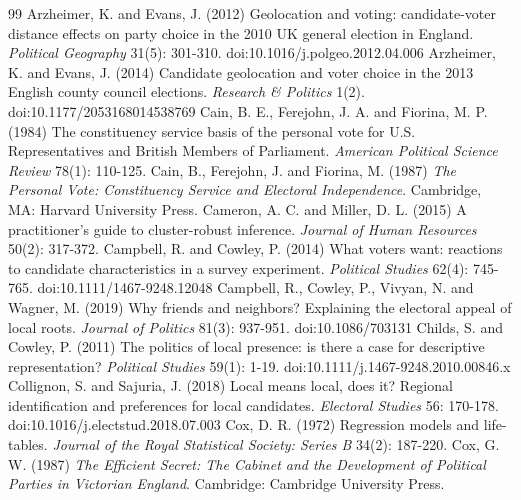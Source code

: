 \documentclass[11pt,a4paper]{article}
\begin{document}
\begin{thebibliography}{99}
 Arzheimer, K. and Evans, J. (2012) Geolocation and voting: candidate-voter distance effects on party choice in the 2010 UK general election in England. \textit{Political Geography} 31(5): 301-310. doi:10.1016/j.polgeo.2012.04.006
 Arzheimer, K. and Evans, J. (2014) Candidate geolocation and voter choice in the 2013 English county council elections. \textit{Research \& Politics} 1(2). doi:10.1177/2053168014538769
 Cain, B. E., Ferejohn, J. A. and Fiorina, M. P. (1984) The constituency service basis of the personal vote for U.S. Representatives and British Members of Parliament. \textit{American Political Science Review} 78(1): 110-125.
 Cain, B., Ferejohn, J. and Fiorina, M. (1987) \textit{The Personal Vote: Constituency Service and Electoral Independence}. Cambridge, MA: Harvard University Press.
 Cameron, A. C. and Miller, D. L. (2015) A practitioner's guide to cluster-robust inference. \textit{Journal of Human Resources} 50(2): 317-372.
 Campbell, R. and Cowley, P. (2014) What voters want: reactions to candidate characteristics in a survey experiment. \textit{Political Studies} 62(4): 745-765. doi:10.1111/1467-9248.12048
 Campbell, R., Cowley, P., Vivyan, N. and Wagner, M. (2019) Why friends and neighbors? Explaining the electoral appeal of local roots. \textit{Journal of Politics} 81(3): 937-951. doi:10.1086/703131
 Childs, S. and Cowley, P. (2011) The politics of local presence: is there a case for descriptive representation? \textit{Political Studies} 59(1): 1-19. doi:10.1111/j.1467-9248.2010.00846.x
 Collignon, S. and Sajuria, J. (2018) Local means local, does it? Regional identification and preferences for local candidates. \textit{Electoral Studies} 56: 170-178. doi:10.1016/j.electstud.2018.07.003
 Cox, D. R. (1972) Regression models and life-tables. \textit{Journal of the Royal Statistical Society: Series B} 34(2): 187-220.
 Cox, G. W. (1987) \textit{The Efficient Secret: The Cabinet and the Development of Political Parties in Victorian England}. Cambridge: Cambridge University Press.

\end{thebibliography}
\end{document}
